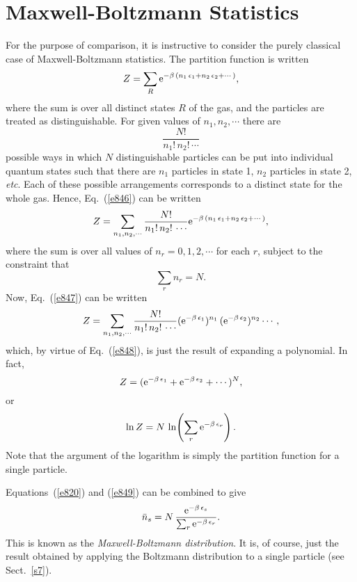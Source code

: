 \section{Maxwell-Boltzmann Statistics}
For the purpose of comparison, it is instructive to consider the purely
classical case of Maxwell-Boltzmann statistics. The partition
function is written
\begin{equation}\label{e846}
Z=\sum_{R} {\rm e}^{-\beta\,(n_1\,\epsilon_1+n_2\,\epsilon_2+\cdots)},
\end{equation}
where the sum is over all distinct states $R$ of the gas, and the particles
are treated as distinguishable. For given values of $n_1, n_2,\cdots$ there
are
\begin{equation}
\frac{N!}{n_1 !\,n_2!\,\cdots}
\end{equation}
possible ways in which $N$ distinguishable 
particles can be put into individual quantum states such that there are $n_1$
particles in state 1, $n_2$ particles in state 2, {\em etc}. Each of these possible
arrangements corresponds to a distinct state for the whole gas.
Hence, Eq.~(\ref{e846}) can be written 
\begin{equation}\label{e847}
Z = \sum_{n_1,n_2,\cdots} \frac{N!}{n_1 !\,n_2!\,\cdots} {\rm e}^{-\beta\,(n_1\,\epsilon_1+n_2\,\epsilon_2+\cdots)},
\end{equation}
where the sum is over all values of $n_r=0,1,2,\cdots$ for each $r$, subject to
the constraint that
\begin{equation}\label{e848}
\sum_r n_r = N.
\end{equation}
Now, Eq.~(\ref{e847}) can be written
\begin{equation}
Z = \sum_{n_1,n_2,\cdots} \frac{N!}{n_1 !\,n_2!\,\cdots} 
({\rm e}^{-\beta\,\epsilon_1})^{n_1}\,({\rm e}^{-\beta\,\epsilon_2})^{n_2}
\cdots,
\end{equation}
which, by virtue of Eq.~(\ref{e848}), is just the result of
expanding a polynomial. In fact,
\begin{equation}
Z = ({\rm e}^{-\beta\,\epsilon_1}+{\rm e}^{-\beta\,\epsilon_2}+
\cdots)^N,
\end{equation}
or
\begin{equation}\label{e849}
\ln Z = N\,\ln\!\left(\sum_r {\rm e}^{-\beta\,\epsilon_r}\right).
\end{equation}
Note that the argument of the logarithm is simply the partition function
for a single particle. 

Equations~(\ref{e820}) and (\ref{e849}) can be combined to give
\begin{equation}
\bar{n}_s = N\,\frac{{\rm e}^{-\beta\,\epsilon_s}}
{\sum_r {\rm e}^{-\beta\,\epsilon_r}}.
\end{equation}
This is known as the {\em Maxwell-Boltzmann distribution}. It is, of course,
just the result obtained by applying the Boltzmann distribution to a single
particle (see Sect.~\ref{s7}).

